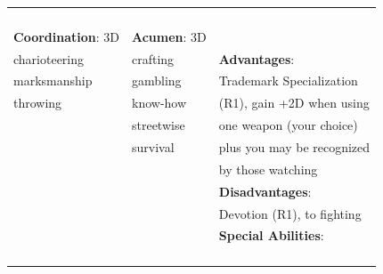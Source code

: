 \documentclass[10pt]{article}
\begin{document}
\begin{table}
\begin{tabular}{m{156pt} m{156pt} m{156pt}}
 \hrulefill &  \hrulefill & \\

 \hrulefill &  \hrulefill & \\

 \hrulefill &  \hrulefill & \\

 \hrulefill &  \hrulefill & \\


\textbf{Coordination}: 3D \hrulefill & \textbf{Acumen}: 3D \hrulefill     & \hrulefill \\

charioteering        \hrulefill & crafting             \hrulefill & \textbf{Advantages}: \hrulefill \\

marksmanship         \hrulefill & gambling             \hrulefill & Trademark Specialization \hrulefill \\

throwing             \hrulefill & know-how             \hrulefill & (R1), gain +2D when using \hrulefill \\

 \hrulefill & streetwise           \hrulefill & one weapon (your choice) \hrulefill \\

 \hrulefill & survival             \hrulefill & plus you may be recognized \hrulefill \\

 \hrulefill &  \hrulefill & by those watching \hrulefill \\

 \hrulefill &  \hrulefill & \textbf{Disadvantages}: \hrulefill \\

 \hrulefill &  \hrulefill & Devotion (R1), to fighting \hrulefill \\

 \hrulefill &  \hrulefill & \textbf{Special Abilities}: \hrulefill \\

 \hrulefill &  \hrulefill &  \hrulefill \\

 \hrulefill &  \hrulefill &  \hrulefill \\

 \hrulefill &  \hrulefill &  \hrulefill \\

 \hrulefill &  \hrulefill &  \hrulefill \\



\end{tabular}
\end{table}
\end{document}
